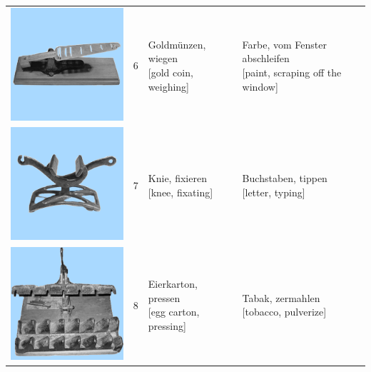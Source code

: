 \documentclass[
  english,
  doc,12pt,twoside,floatsintext]{apa7}
\begin{document}
\begin{center}
\begin{ThreePartTable}
{\begin{longtable}{llll}
\includegraphics[valign=c, scale=0.23]{../materials/unfamiliar/6.png} & 6 & \makecell[l]{Goldmünzen, wiegen\\{[gold coin, weighing]}} & \makecell[l]{Farbe, vom Fenster abschleifen\\{[paint, scraping off the window]}}\\
\includegraphics[valign=c, scale=0.23]{../materials/unfamiliar/7.png} & 7 & \makecell[l]{Knie, fixieren\\{[knee, fixating]}} & \makecell[l]{Buchstaben, tippen\\{[letter, typing]}}\\
\includegraphics[valign=c, scale=0.23]{../materials/unfamiliar/8.png} & 8 & \makecell[l]{Eierkarton, pressen\\{[egg carton, pressing]}} & \makecell[l]{Tabak, zermahlen\\{[tobacco, pulverize]}}\\

\end{longtable}}
\end{ThreePartTable}
\end{center}
\end{document}
